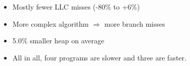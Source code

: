 \begin{frame}
  \begin{itemize}
    \item<1-> Mostly fewer LLC misses (-80\% to +6\%)
    \item<2-> More complex algorithm $\Rightarrow$ more branch misses
    \item<3-> 5.0\% smaller heap on average
    \item<4-> All in all, four programs are slower and three are faster.
  \end{itemize}

\end{frame}
